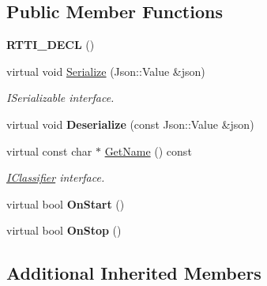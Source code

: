\subsection*{Public Member Functions}
\begin{DoxyCompactItemize}
\item 
\mbox{\label{class_proximity_classifier_a9510dd9ca45cd31fb5f104587dacf2d1}} 
{\bfseries R\+T\+T\+I\+\_\+\+D\+E\+CL} ()
\item 
\mbox{\label{class_proximity_classifier_a1945267300b153cf021777fbb918c6c0}} 
virtual void \hyperlink{class_proximity_classifier_a1945267300b153cf021777fbb918c6c0}{Serialize} (Json\+::\+Value \&json)
\begin{DoxyCompactList}\small\item\em I\+Serializable interface. \end{DoxyCompactList}\item 
\mbox{\label{class_proximity_classifier_a462a8a339e0b6b5b8d76b2bbf42ad0d5}} 
virtual void {\bfseries Deserialize} (const Json\+::\+Value \&json)
\item 
\mbox{\label{class_proximity_classifier_a612c087a73b3b90a1d2619291bd5b8f4}} 
virtual const char $\ast$ \hyperlink{class_proximity_classifier_a612c087a73b3b90a1d2619291bd5b8f4}{Get\+Name} () const
\begin{DoxyCompactList}\small\item\em \hyperlink{class_i_classifier}{I\+Classifier} interface. \end{DoxyCompactList}\item 
\mbox{\label{class_proximity_classifier_aa27d2478586ac3c527e30730f3a1ce1b}} 
virtual bool {\bfseries On\+Start} ()
\item 
\mbox{\label{class_proximity_classifier_a16728c50b71de336fd652800627083b9}} 
virtual bool {\bfseries On\+Stop} ()
\end{DoxyCompactItemize}
\subsection*{Additional Inherited Members}


